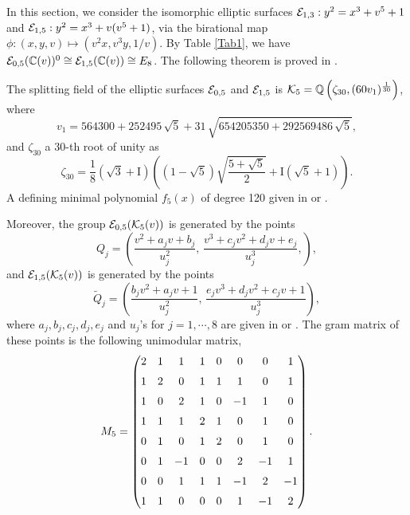 \documentclass[11pt]{amsart}
\begin{document}
In this section, we  consider the isomorphic  elliptic surfaces   ${\mathcal E}_{1, 3}: y^2=x^3+ v^5+1$
and  ${\mathcal E}_{1, 5}: y^2=x^3+   v (v^5+1)$, via the birational map 
$\phi: (x,y,v) \mapsto (v^2 x, v^3 y, 1/v)$.
By Table \ref{Tab1}, we have   ${\mathcal E}_{0, 5}({\mathbb C}(v))^0\cong {\mathcal E}_{1,5}({\mathbb C}(v))\cong E_8$.
The following theorem is proved in  \cite[Theorem 1.3]{SS-Shz-2025}.
\begin{thm}
	\label{main2}
	The splitting field  of the elliptic  surfaces  ${\mathcal E}_{0,5}$  and ${\mathcal E}_{1,5}$	is 
	${\mathcal K}_5 = {\mathbb Q} \left(\zeta_{30}, (60 v_1)^{\frac{1}{30}}\right)$, where
	$$ v_1=564300+252495\,\sqrt {5}+31\,\sqrt {654205350+292569486\,\sqrt {5}},$$ 
	and $\zeta_{30}$ a $30$-th root of unity as 
	$$	\zeta_{30}=\frac{1}{8}\left(\sqrt{3}+\mathrm{I}\right) \left( \left(1-  \sqrt{5}\right) \sqrt{\frac{5+  \sqrt{5}}{2}}+\mathrm{I} \left(\sqrt{5}+1\right)\right).$$
	A defining minimal polynomial $f_5(x)$ of degree 120 given in \cite[minpols]{Shioda-Codes} or \cite[Gp-360]{Shioda360-Codes}.
	
	Moreover,  the   group ${\mathcal E}_{0, 5}({\mathcal K}_5(v))$ is generated by the points
	$$Q_j=\left( \frac{ v^2 + a_j v +b_j}{u_j^2}, \, \frac{v^3 +c_j v^2 + d_j v +e_j}{u_j^3},\right),  $$
	and   ${\mathcal E}_{1, 5}({\mathcal K}_5(v))$ is generated by the points
	$$\tilde{Q}_j=\left( \frac{ b_j v^2 + a_j v +1}{u_j^2}, \,
	\frac{e_j v^3 +d_j v^2 + c_j v +1}{u_j^3} \right),$$ 
	where  $a_j, b_j, c_j, d_j, e_j$  and  $u_j$'s for $j=1,\cdots, 8$  are given in 	\cite[Points-5]{Shioda-Codes} or \cite[Points-5]{Shioda360-Codes}.	
	The   gram matrix of these points is the following unimodular matrix,
	\begin{equation}
		M_5 =
		\begin{pmatrix}
			\label{m5}
			2 & 1 & 1 & 1 & 0 & 0 & 0 & 1 
			\\ \noalign{\medskip}
			1 & 2 & 0 & 1 & 1 & 1 & 0 & 1 
			\\ \noalign{\medskip}
			1 & 0 & 2 & 1 & 0 & -1 & 1 & 0 
			\\ \noalign{\medskip}
			1 & 1 & 1 & 2 & 1 & 0 & 1 & 0 
			\\ \noalign{\medskip}
			0 & 1 & 0 & 1 & 2 & 0 & 1 & 0 
			\\ \noalign{\medskip}
			0 & 1 & -1 & 0 & 0 & 2 & -1 & 1 
			\\ \noalign{\medskip}
			0 & 0 & 1 & 1 & 1 & -1 & 2 & -1 
			\\ \noalign{\medskip}
			1 & 1 & 0 & 0 & 0 & 1 & -1 & 2 	
		\end{pmatrix}.
	\end{equation}
\end{thm}
\end{document}
